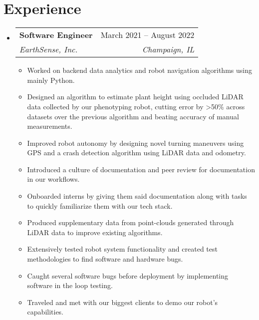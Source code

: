 \documentclass[letterpaper,11pt]{article}
\makeatletter
\newcommand{\resumeItem}[1]{
  \item\small{
    {#1 \vspace{-2pt}}
  }
}
\newcommand{\resumeSubheading}[4]{
  \vspace{-2pt}\item
    \begin{tabular*}{0.97\textwidth}[t]{l@{\extracolsep{\fill}}r}
      \textbf{#1} & #2 \\
      \textit{\small#3} & \textit{\small #4} \\
    \end{tabular*}\vspace{-7pt}
}
\newcommand{\resumeSubSubheading}[2]{
    \item
    \begin{tabular*}{0.97\textwidth}{l@{\extracolsep{\fill}}r}
      \textit{\small#1} & \textit{\small #2} \\
    \end{tabular*}\vspace{-7pt}
}
\newcommand{\resumeSubHeadingListStart}
{\begin{itemize}[leftmargin=0.15in, label={}]}
\newcommand{\resumeSubHeadingListEnd}{\end{itemize}}
\newcommand{\resumeItemListStart}{\begin{itemize}}
\newcommand{\resumeItemListEnd}{\end{itemize}\vspace{-5pt}}
\makeatother
\begin{document}
\section{Experience}
\resumeSubHeadingListStart

\resumeSubheading
{Software Engineer}{March 2021 -- August 2022}
{EarthSense, Inc.}{Champaign, IL}
\resumeItemListStart
\resumeItem{Worked on backend data analytics and robot navigation algorithms using mainly Python.}
\resumeItem{Designed an algorithm to estimate plant height using occluded LiDAR data collected by our phenotyping robot, cutting error by >50\% across datasets over the previous algorithm and beating accuracy of manual measurements.}
\resumeItem{Improved robot autonomy by designing novel turning maneuvers using GPS and a crash detection algorithm using LiDAR data and odometry. }
\resumeItem{Introduced a culture of documentation and peer review for documentation in our workflows.}
\resumeItem{Onboarded interns by giving them said documentation along with tasks to quickly familiarize them with our tech stack.}
\resumeItem{Produced supplementary data from point-clouds generated through LiDAR data to improve existing algorithms.}
\resumeItem{Extensively tested robot system functionality and created test methodologies to find software and hardware bugs.}
\resumeItem{Caught several software bugs before deployment by implementing software in the loop testing.}
\resumeItem{Traveled and met with our biggest clients to demo our robot's capabilities.}

\resumeItemListEnd


\resumeSubHeadingListEnd


\end{document}
